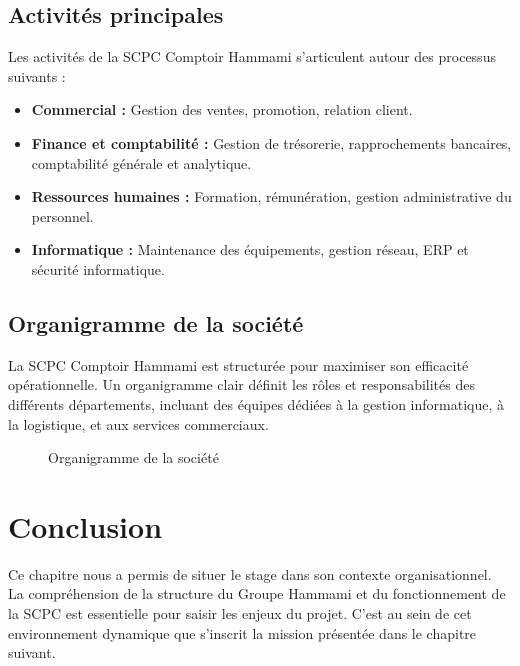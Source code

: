 \subsection{Activités principales}
Les activités de la SCPC Comptoir Hammami s’articulent autour des processus suivants :
\begin{itemize}
    \item \textbf{Commercial :} Gestion des ventes, promotion, relation client.
    \item \textbf{Finance et comptabilité :} Gestion de trésorerie, rapprochements bancaires, comptabilité générale et analytique.
    \item \textbf{Ressources humaines :} Formation, rémunération, gestion administrative du personnel.
    \item \textbf{Informatique :} Maintenance des équipements, gestion réseau, ERP et sécurité informatique.
\end{itemize}

\subsection{Organigramme de la société}
La SCPC Comptoir Hammami est structurée pour maximiser son efficacité opérationnelle. Un organigramme clair définit les rôles et responsabilités des différents départements, incluant des équipes dédiées à la gestion informatique, à la logistique, et aux services commerciaux.

\begin{figure}[H]
    \centering
    \caption{Organigramme de la société}
    \label{fig:organigramme}
\end{figure}

\section*{Conclusion}
Ce chapitre nous a permis de situer le stage dans son contexte organisationnel. La compréhension de la structure du Groupe Hammami et du fonctionnement de la SCPC est essentielle pour saisir les enjeux du projet. C'est au sein de cet environnement dynamique que s'inscrit la mission présentée dans le chapitre suivant.
